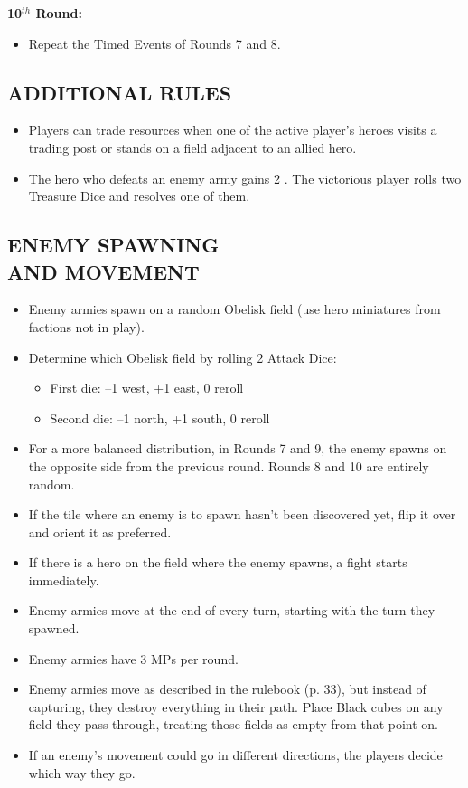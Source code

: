 \begin{multicols*}{2}
\textbf{10$^{th}$ Round:}
\begin{itemize}
  \item Repeat the Timed Events of Rounds 7 and 8.
\end{itemize}

\subsection*{\MakeUppercase{Additional Rules}}

\begin{itemize}
  \item Players can trade resources when one of the active player's heroes visits a trading post or stands on a field adjacent to an allied hero.
  \item The hero who defeats an enemy army gains 2 .
    The victorious player rolls two Treasure Dice and resolves one of them.
\end{itemize}

\subsection*{\MakeUppercase{Enemy Spawning\\and Movement}}

\begin{itemize}
  \item Enemy armies spawn on a random Obelisk field (use hero miniatures from factions not in play).
  \item Determine which Obelisk field by rolling 2 Attack Dice:
  \begin{itemize}[leftmargin=15pt]
    \item First die: --1 west, +1 east, 0 reroll
    \item Second die: --1 north, +1 south, 0 reroll
  \end{itemize}
  \item For a more balanced distribution, in Rounds 7 and 9, the enemy spawns on the opposite side from the previous round.
    Rounds 8 and 10 are entirely random.
  \item If the tile where an enemy is to spawn hasn't been discovered yet, flip it over and orient it as preferred.
  \item If there is a hero on the field where the enemy spawns, a fight starts immediately.
  \item Enemy armies move at the end of every turn, starting with the turn they spawned.
  \item Enemy armies have 3 MPs per round.
  \item Enemy armies move as described in the rulebook (p. 33), but instead of capturing, they destroy everything in their path.
    Place Black cubes on any field they pass through, treating those fields as empty from that point on.
  \item If an enemy's movement could go in different directions, the players decide which way they go.
\end{itemize}


\end{multicols*}
